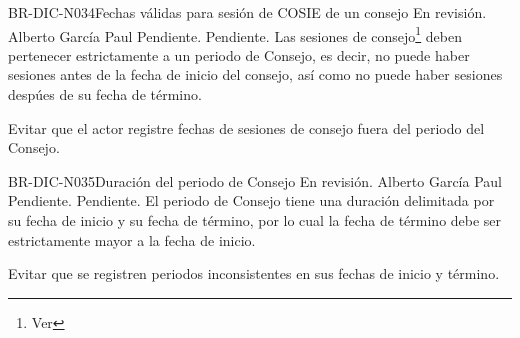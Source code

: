 \begin{BusinessRule}{BR-DIC-N034}{Fechas válidas para sesión de COSIE de un consejo }
	{\bcCondition} %
	{\btEnabler}     %
	{\blControlling}     %
	\BRItem[Estado] En revisión.
	 Alberto García Paul
	 Pendiente.
	 Pendiente.
	\BRItem[Descripción] Las sesiones de consejo\footnote{Ver } deben pertenecer estrictamente a un periodo de Consejo, es decir, no puede haber sesiones antes de la fecha de inicio del consejo, así como no puede haber sesiones despúes de su fecha de término.
	\BRItem[Sentencia] \cdtEmpty
	
	\BRItem[Motivación] Evitar que el actor registre fechas de sesiones de consejo fuera del periodo del Consejo.
\end{BusinessRule}

\begin{BusinessRule}{BR-DIC-N035}{Duración del periodo de Consejo}
	{\bcCondition} %
	{\btEnabler}     %
	{\blControlling}     %
	\BRItem[Estado] En revisión.
	 Alberto García Paul
	 Pendiente.
	 Pendiente.
	\BRItem[Descripción] El periodo de Consejo tiene una duración delimitada por su fecha de inicio y su fecha de término, por lo cual la fecha de término debe ser estrictamente mayor a la fecha de inicio.
	\BRItem[Sentencia] \cdtEmpty
	
	\BRItem[Motivación] Evitar que se registren periodos inconsistentes en sus fechas de inicio y término.
\end{BusinessRule}


